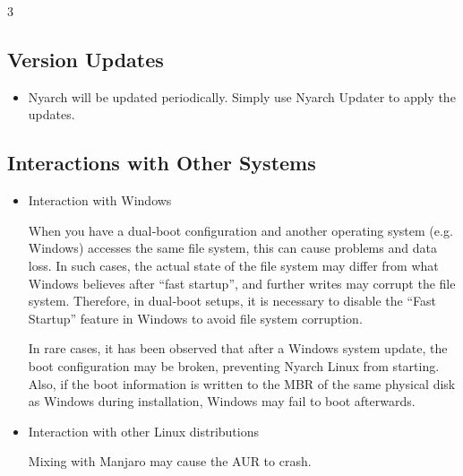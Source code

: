 \documentclass{article}
\begin{document}
\begin{multicols*}{3}

	 \begin{tcolorbox}
	 \section*{Version Updates}
	 \end{tcolorbox}
	 	\begin{itemize}[leftmargin=*]
		\setlength{\itemsep}{0pt}
		\setlength{\parskip}{0pt}
		\setlength{\parsep}{0pt}

		\item Nyarch will be updated periodically. Simply use Nyarch Updater to apply the updates.

	\end{itemize}


	\begin{tcolorbox}
	\section*{Interactions with Other Systems}
	\end{tcolorbox}
	\begin{itemize}[leftmargin=*]
		\setlength{\parindent}{0pt}

		\item Interaction with Windows

		When you have a dual‑boot configuration and another operating system (e.g. Windows) accesses the same file system, this can cause problems and data loss. In such cases, the actual state of the file system may differ from what Windows believes after “fast startup”, and further writes may corrupt the file system. Therefore, in dual‑boot setups, it is necessary to disable the “Fast Startup” feature in Windows to avoid file system corruption.

		In rare cases, it has been observed that after a Windows system update, the boot configuration may be broken, preventing Nyarch Linux from starting. Also, if the boot information is written to the MBR of the same physical disk as Windows during installation, Windows may fail to boot afterwards.

		\item Interaction with other Linux distributions

		Mixing with Manjaro may cause the AUR to crash.

	\end{itemize}


	\begin{tcolorbox}

\end{tcolorbox}
\end{multicols*}
\end{document}

